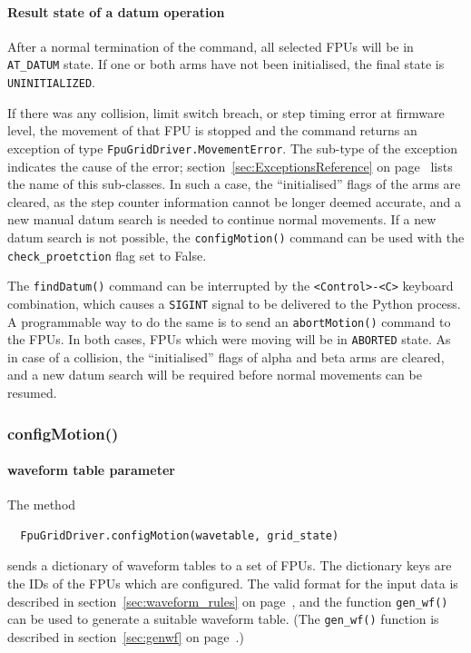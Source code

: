 \documentclass[11pt,a4paper]{scrartcl}
\begin{document}
\paragraph{Result state of a datum operation}

After a normal termination of the command, all selected FPUs will be
in \texttt{AT\_DATUM} state. If one or both arms have not been
initialised, the final state is \texttt{UNINITIALIZED}.

\begin{sloppypar}
If there was any collision, limit switch breach, or step timing error
at firmware level, the movement of that FPU is stopped and the command
returns an exception of type \texttt{FpuGridDriver.MovementError}. The
sub-type of the exception indicates the cause of the error;
section~\ref{sec:ExceptionsReference} on
page~\pageref{sec:ExceptionsReference} lists the name of this
sub-classes. In such a case, the ``initialised'' flags of the arms
are cleared, as the step counter information cannot be longer deemed
accurate, and a new manual datum search is needed to continue normal
movements. If a new datum search is not possible, the
\texttt{configMotion()} command can be used with the
\texttt{check\_proetction} flag set to False.
\end{sloppypar}


The \texttt{findDatum()} command can be interrupted by the
\texttt{<Control>-<C>} keyboard combination, which causes a
\texttt{SIGINT} signal to be delivered to the Python process. A
programmable way to do the same is to send an \texttt{abortMotion()}
command to the FPUs.  In both cases, FPUs which were moving will be in
\texttt{ABORTED} state. As in case of a collision, the ``initialised''
flags of alpha and beta arms are cleared, and a new datum search will
be required before normal movements can be resumed.




\subsubsection{configMotion()}
\label{sec:configmotion}
\paragraph{waveform table parameter}

The method
\begin{verbatim}
  FpuGridDriver.configMotion(wavetable, grid_state)
\end{verbatim}
sends a dictionary of waveform tables to a set of FPUs. The dictionary
keys are the IDs of the FPUs which are configured. The valid format
for the input data is described in section~\ref{sec:waveform_rules} on
page~\pageref{sec:waveform_rules}, and the function \texttt{gen\_wf()}
can be used to generate a suitable waveform table. (The
\texttt{gen\_wf()} function is described in section~\ref{sec:genwf} on
page~\pageref{sec:genwf}.)
\end{document}
